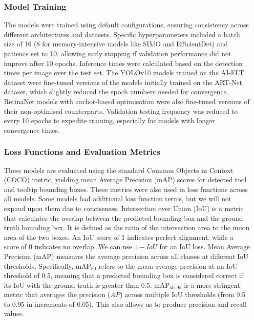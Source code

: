 \subsubsection{Model Training}

The models were trained using default configurations, ensuring consistency across different architectures and datasets. Specific hyperparameters included a batch size of 16 (8 for memory-intensive models like SIMO and EfficientDet) and patience set to 10, allowing early stopping if validation performance did not improve after 10 epochs. Inference times were calculated based on the detection times per image over the test set. The YOLOv10 models trained on the AI-ELT dataset were fine-tuned versions of the models initially trained on the ART-Net dataset, which slightly reduced the epoch numbers needed for convergence. RetinaNet models with anchor-based optimisation were also fine-tuned versions of their non-optimised counterparts. Validation testing frequency was reduced to every 10 epochs to expedite training, especially for models with longer convergence times.


\subsubsection{Loss Functions and Evaluation Metrics}

These models are evaluated using the standard Common Objects in Context (COCO) metric, yielding mean Average Precision (mAP) scores for detected tool and tooltip bounding boxes. These metrics were also used in loss functions across all models. Some models had additional loss function terms, but we will not expand upon them due to conciseness. Intersection over Union (IoU) is a metric that calculates the overlap between the predicted bounding box and the ground truth bounding box. It is defined as the ratio of the intersection area to the union area of the two boxes. An IoU score of 1 indicates perfect alignment, while a score of 0 indicates no overlap. We can use $1 - IoU$ for an IoU loss. Mean Average Precision (mAP) measures the average precision across all classes at different IoU thresholds. Specifically, mAP${_50}$ refers to the mean average precision at an IoU threshold of 0.5, meaning that a predicted bounding box is considered correct if its IoU with the ground truth is greater than 0.5. mAP${_{50:95}}$ is a more stringent metric that averages the precision ($AP$) across multiple IoU thresholds (from 0.5 to 0.95 in increments of 0.05). This also allows us to produce precision and recall values.

